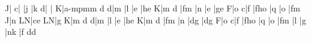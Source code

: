 \barre\NOtes {}\bohlp J|\enotes
\temps\NOtes{}\ql c|\enotes
\temps\NOtes{}|\boqu j\enotes
\barre\NOtes {}|\bohu k\enotes 
\temps\NOtes{}\zql d|\enotes 
\temps\NOtes{}|\soupir\enotes
\barre\NOtes{} \bohlp K|\zcharnote a{\kern -\Interligne\ppff mp}\cna m\hu m\enotes
\temps\NOtes{}\qu d\enotes
\temps\NOtes{}\qu d|\qu m\enotes
\barre\NOtes {}|\hup l\enotes
\temps\NOtes{}|\qu e\enotes
\temps\NOtes{}|\zq h\qu e\enotes
\barre\NOtes {}\bohlp K|\hu m\enotes
\temps\NOtes{}\qu d\enotes
\temps\NOtes{}|\zql f\qu m\enotes
\barre\NOtes {}|\hup n\enotes
\temps\NOtes{}|\qu e\enotes
\temps\NOtes{}|\zq g\qu e\enotes
\barre\NOtes {}\bohup F|\hu o\enotes
\temps\NOtes{}\qu c|\qu f\enotes
\temps\NOtes{}|\zql f\zq h\qu o\enotes
\barre\NOtes {}|\qu q\enotes
\temps\NOtes{}|\qu o\enotes
\temps\NOtes{}|\zql f\qu m\enotes
\barre\NOtes {}\bohlp J|\hu n\enotes 
\temps\NOtes\zq L\qu N|\zq c\qu e\enotes 
\temps\NOtes\zq L\qu N|\qu g\enotes
\ifx\mxversion\undefined\def\atnextline{\autolines665}\fi %
\barre\NOtes{}\bohlp K|\hu m\enotes
\temps\NOtes{}\qu d\enotes
\temps\NOtes{}\qu d|\qu m\enotes
\barre\NOtes {}|\hup l\enotes
\temps\NOtes{}|\qu e\enotes
\temps\NOtes{}|\zq h\qu e\enotes
\barre\NOtes {}\bohlp K|\hu m\enotes
\temps\NOtes{}\qu d\enotes
\temps\NOtes{}|\zql f\qu m\enotes
\barre\NOtes {}|\hup n\enotes
\temps\NOtes{}|\zq d\qu g\enotes
\temps\NOtes{}|\zq d\zq g\enotes
\barre\NOtes {}\bohup F|\hu o\enotes
\temps\NOtes{}\qu c|\qu f\enotes
\temps\NOtes{}|\zql f\zq h\qu o\enotes
\barre\NOtes {}|\qu q\enotes
\temps\NOtes{}|\qu o\enotes
\temps\NOtes{}|\zql f\qu m\enotes
\barre\NOtes {}|\hup l\enotes
\temps\NOtes{}\enotes
\temps\NOtes{}|\ql g\enotes
\barre\NOtes {}\relax
  |\pointdorgue n\hup k\enotes
\temps\NOtes{}|\ql f\enotes
\temps\NOtes\pointdorgue d\ql d\enotes
\finmorceau
   \rightline{\sl \aujourdhui}\eject
\bye






